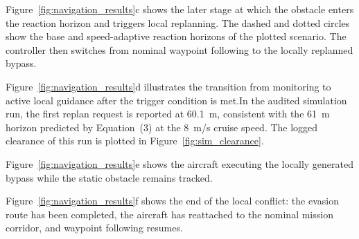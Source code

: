 \documentclass[electronics,article,submit,moreauthors]{Definitions/mdpi}
\DeclareRobustCommand{\deleted}[1]{}%
\DeclareRobustCommand{\added}[1]{#1}%
\DeclareRobustCommand{\deleted}[1]{\textcolor{black}{\sout{#1}}}
\DeclareRobustCommand{\added}[1]{\textcolor{green!50!black}{#1}}
\def\deleted#1{}%
\def\added#1{#1}%
\begin{document}
\deleted{In contrast}\added{Figure~\ref{fig:navigation_results}c shows the later stage at which the obstacle enters the reaction horizon and triggers local replanning. The dashed and dotted circles show the base and speed-adaptive reaction horizons of the plotted scenario. The controller then switches from nominal waypoint following} to the \deleted{previous paragraph and figure, where the obstacle had already been detected but remained outside the safety radius, Figure \ref{fig:navigation_results} 1C represents a later stage of the encounter. At this instant, the obstacle has entered the margins of the reaction distance (the dashed circle is the limit of the reaction radius, while the dot circle is an external limit taking into account the position error), triggering the trajectory replanning process. As a result, the system begins to compute an avoidance route designed to prevent a potential conflict and preserve the required separation margins.}\added{locally replanned bypass.}


\deleted{The visualization represented in }Figure\deleted{ }\added{~}\ref{fig:navigation_results}\deleted{ 1D therefore}\added{d} illustrates the transition from \deleted{a passive }monitoring \deleted{state, in which the obstacle is detected but no corrective action is required, to an active guidance state, in which the system evaluates the conflict and generates a feasible alternative path.}\added{to active local guidance after the trigger condition is met.}\deleted{In this case, the}\added{In the audited simulation run, the first} replan request is reported at \deleted{a nearest-obstacle distance of 60.7}\added{60.1}~m, consistent with the 61~m horizon predicted by Equation~(3)\deleted{.}\added{ at the 8~m/s cruise speed. The logged clearance of this run is plotted in Figure~\ref{fig:sim_clearance}.} 

\deleted{In Figure \ref{fig:navigation_results} 1E, it is appreciable how the UA is performing the evasion maneuver through the alternative}\added{Figure~\ref{fig:navigation_results}e shows the aircraft executing the locally} generated \deleted{path,}\added{bypass} while the static obstacle remains tracked\deleted{ and no conflict is reported.}\added{.}


Figure\deleted{ }\added{~}\ref{fig:navigation_results}\deleted{ 1F}\added{f} shows the \deleted{complete resolution}\added{end} of the \added{local }conflict\deleted{, once the UAS has successfully rejoined its original path and can continue with the data acquisition Mission. At this stage, the avoidance maneuver}\added{: the evasion route} has been completed, \deleted{and the vehicle has returned to}\added{the aircraft has reattached to the} nominal \deleted{operation, resuming the planned inspection or monitoring task. This moment represents the final phase of the guidance response, where the temporary deviation introduced to maintain safe separation is no longer required and the Mission can proceed under normal conditions.}\added{mission corridor, and waypoint following resumes.}
\end{document}
